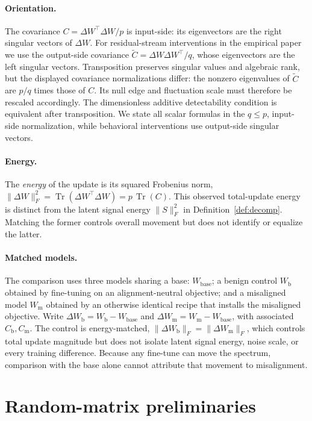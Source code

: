\documentclass[11pt]{article}
\theoremstyle{definition}
\theoremstyle{remark}
\newcommand{\norm}[1]{\lVert #1 \rVert}
\DeclareMathOperator{\Tr}{Tr}
\newcommand{\dW}{\Delta W}
\newcommand{\Wb}{W_{\mathrm{b}}}
\newcommand{\Wm}{W_{\mathrm{m}}}
\begin{document}
\paragraph{Orientation.}
The covariance $C=\dW^{\!\top}\dW/p$ is input-side: its eigenvectors are the right
singular vectors of $\dW$. For residual-stream interventions in the empirical paper we
use the output-side covariance $\widetilde C=\dW\dW^{\!\top}/q$, whose eigenvectors are the
left singular vectors. Transposition preserves singular values and algebraic rank, but
the displayed covariance normalizations differ: the nonzero eigenvalues of
$\widetilde C$ are $p/q$ times those of $C$. Its null edge and fluctuation scale must
therefore be rescaled accordingly. The dimensionless additive detectability condition is
equivalent after transposition. We state all scalar formulas in the $q\le p$, input-side
normalization, while behavioral interventions use output-side singular vectors.

\paragraph{Energy.}
The \emph{energy} of the update is its squared Frobenius norm,
$\norm{\dW}_F^2 = \Tr(\dW^{\!\top}\dW) = p\,\Tr(C)$. This observed total-update
energy is distinct from the latent signal energy $\norm{S}_F^2$ in
Definition~\ref{def:decomp}. Matching the former controls overall movement but
does not identify or equalize the latter.

\paragraph{Matched models.}
The comparison uses three models sharing a base:
$W_{\mathrm{base}}$; a benign control $\Wb$ obtained by fine-tuning on an
alignment-neutral objective; and a misaligned model $\Wm$ obtained by an otherwise
identical recipe that installs the misaligned objective. Write
$\dW_{\mathrm b} = \Wb - W_{\mathrm{base}}$ and $\dW_{\mathrm m} = \Wm - W_{\mathrm{base}}$,
with associated $C_{\mathrm b}, C_{\mathrm m}$. The control is energy-matched,
$\norm{\dW_{\mathrm b}}_F = \norm{\dW_{\mathrm m}}_F$, which controls total update
magnitude but does not isolate latent signal energy, noise scale, or every training
difference. Because any fine-tune can move the spectrum, comparison with the base
alone cannot attribute that movement to misalignment.

\section{Random-matrix preliminaries}
\label{sec:rmt}
\end{document}
